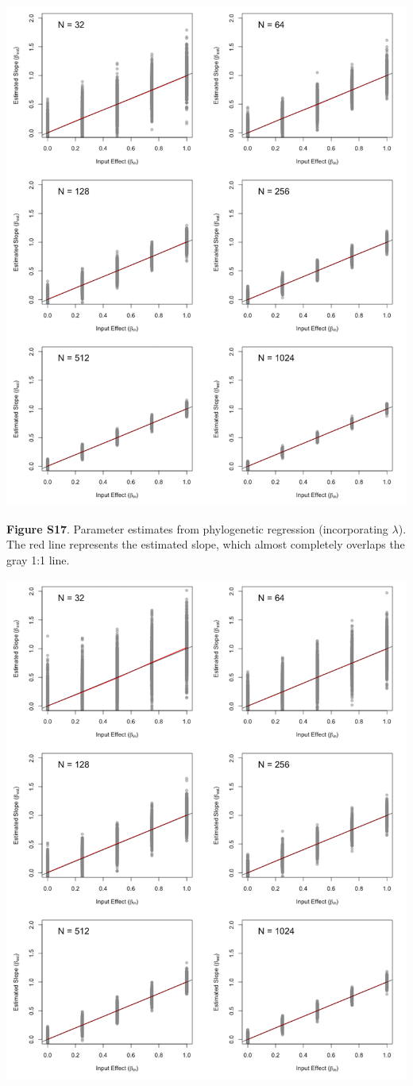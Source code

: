 \documentclass[
]{article}
\begin{document}
\includegraphics[width=0.95\linewidth]{fig.S17}

\textbf{Figure S17}. Parameter estimates from phylogenetic regression
(incorporating \(\lambda\)). The red line represents the estimated
slope, which almost completely overlaps the gray 1:1 line.

\includegraphics[width=0.95\linewidth]{fig.S18}
\end{document}
